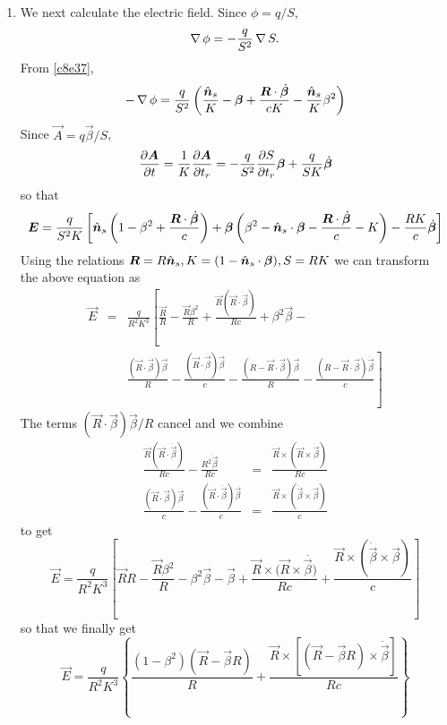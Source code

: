 \begin{enumerate}
\item We next calculate the electric field. Since $\phi = q/S$,
\[
\operatorname{\nabla}\phi = -\frac{q}{S^2}\operatorname{\nabla} S.
\]
From \eqref{c8e37},
\begin{equation}\label{c8e39}
-\operatorname{\nabla}\phi = \frac{q}{S^2}\left(\frac{\hat{\bm{n}}_s}{K} - \bm{\beta} + 
\frac{\bm{R}\cdot\dot{\bm{\beta}}}{cK} - \frac{\hat{\bm{n}}_s}{K}\beta^2\right)
\end{equation}
Since $\vec{A} = q\vec{\beta}/S$,
\[
\frac{\partial{\bm{A}}}{\partial{t}} = \frac{1}{K}\frac{\partial{\bm{A}}}{\partial{t_r}} = 
-\frac{q}{S^2}\frac{\partial{S}}{\partial{t_r}}\bm{\beta} + \frac{q}{SK}\dot{\bm{\beta}}
\]
so that
\begin{equation}\label{c8e40}
\bm{E} = \frac{q}{S^2K}\left[
\hat{\bm{n}}_s\left(1 - \beta^2 + \frac{\bm{R}\cdot\dot{\bm{\beta}}}{c}\right) +
\bm{\beta}\left(\beta^2 - \hat{\bm{n}}_s\cdot\bm{\beta} - 
    \frac{\bm{R}\cdot\dot{\bm{\beta}}}{c} - K\right) - 
\frac{RK}{c}\dot{\bm{\beta}}\right]
\end{equation}
Using the relations $\bm{R} = R\hat{\bm{n}}_s, K = (1 - \hat{\bm{n}}_s\cdot\bm{\beta}), S = RK$
we can transform the above equation as
\begin{eqnarray*}
\vec{E} &=& \frac{q}{R^2K^3}\left[\frac{\vec{R}}{R} - \frac{\vec{R}\beta^2}{R}
 + \frac{\vec{R}(\vec{R}\cdot\dot{\vec{\beta}})}{Rc} + \beta^2\vec{\beta} - \right.\\
 & & \left.\frac{(\vec{R}\cdot\vec{\beta})\vec{\beta}}{R} - 
     \frac{(\vec{R}\cdot\dot{\vec{\beta}})\vec{\beta}}{c} - 
     \frac{(R - \vec{R}\cdot\vec{\beta})\vec{\beta}}{R} - 
     \frac{(R - \vec{R}\cdot\vec{\beta})\dot{\vec{\beta}}}{c}\right]
\end{eqnarray*}
The terms $(\vec{R}\cdot\vec{\beta})\vec{\beta}/R$ cancel and we combine 
\begin{eqnarray*}
\frac{\vec{R}(\vec{R}\cdot\dot{\vec{\beta}})}{Rc} - 
\frac{R^2\dot{\vec{\beta}}}{Rc} &=& 
\frac{\vec{R}\times(\vec{R}\times\dot{\vec{\beta}})}{Rc} \\
\frac{(\vec{R}\cdot\vec{\beta})\dot{\vec{\beta}}}{c} - 
\frac{(\vec{R}\cdot\dot{\vec{\beta}})\vec{\beta}}{c} &=&
\frac{\vec{R}\times(\dot{\vec{\beta}}\times\vec{\beta})}{c}
\end{eqnarray*}
to get
\[
\vec{E} = \frac{q}{R^2K^3}\left[\vec{R}{R} - \frac{\vec{R}\beta^2}{R} -
\beta^2\vec{\beta} - \vec{\beta} + 
\frac{\vec{R}\times(\vec{R}\times\dot{\vec{\beta})}}{Rc} + 
\frac{\vec{R}\times(\dot{\vec{\beta}}\times\vec{\beta})}{c}\right]
\]
so that we finally get
\begin{equation}
\vec{E} = \frac{q}{R^2K^3}\left\{\frac{(1-\beta^2)(\vec{R}-\vec{\beta}R)}{R} +
\frac{\vec{R}\times[(\vec{R} - \vec{\beta}R)\times\dot{\vec{\beta}}]}{Rc}
\right\}
\end{equation}
\end{enumerate}
